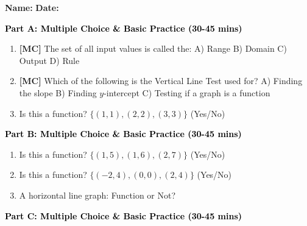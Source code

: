 \documentclass[12pt, letterpaper, fleqn]{article}
\newcommand{\blank}{\underline{\hspace{2.2cm}}}
\begin{document}
\textbf{Name:} \underline{\hspace{5cm}}
\hfill
\textbf{Date:} \underline{\hspace{3cm}}\\


\begin{tcolorbox}[colback=customteal!20]
\large\textcolor{black}{\textbf{Part A: Multiple Choice \& Basic Practice (30-45 mins)}}
\end{tcolorbox}

\vspace{3mm}

\begin{enumerate}[itemsep=2.5cm, leftmargin=0.6cm]
\item \textbf{[MC]} The set of all input values is called the:
A) Range B) Domain C) Output D) Rule
\item \textbf{[MC]} Which of the following is the Vertical Line Test used for?
A) Finding the slope B) Finding $y$-intercept C) Testing if a graph is a function
\item Is this a function? $\{(1,1), (2,2), (3,3)\}$ (Yes/No) \blank
\end{enumerate}

\newpage

\begin{tcolorbox}[colback=customteal!20]
\large\textcolor{black}{\textbf{Part B: Multiple Choice \& Basic Practice (30-45 mins)}}
\end{tcolorbox}

\vspace{3mm}

\begin{enumerate}[itemsep=2.5cm, leftmargin=0.6cm, resume]
\item Is this a function? $\{(1,5), (1,6), (2,7)\}$ (Yes/No) \blank
\item Is this a function? $\{(-2, 4), (0, 0), (2, 4)\}$ (Yes/No) \blank
\item A horizontal line graph: Function or Not? \blank
\end{enumerate}

\newpage

\begin{tcolorbox}[colback=customteal!20]
\large\textcolor{black}{\textbf{Part C: Multiple Choice \& Basic Practice (30-45 mins)}}
\end{tcolorbox}

\vspace{3mm}
\end{document}
